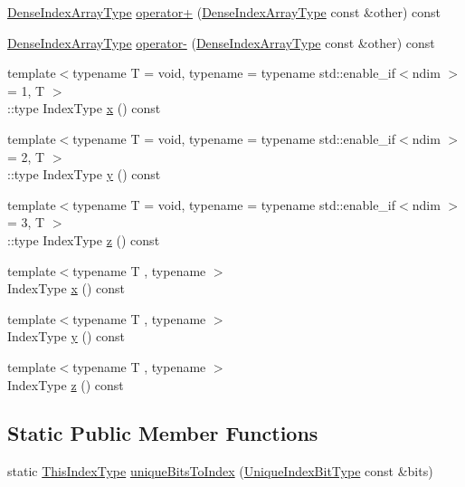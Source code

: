 \begin{DoxyCompactItemize}
\item 
\hyperlink{structvt_1_1index_1_1_dense_index_array_aec95c4ed1b4071d31d24142f02429dbd}{Dense\+Index\+Array\+Type} \hyperlink{structvt_1_1index_1_1_dense_index_array_a2f63f2603e58cf017c07f11f9e233409}{operator+} (\hyperlink{structvt_1_1index_1_1_dense_index_array_aec95c4ed1b4071d31d24142f02429dbd}{Dense\+Index\+Array\+Type} const \&other) const
\item 
\hyperlink{structvt_1_1index_1_1_dense_index_array_aec95c4ed1b4071d31d24142f02429dbd}{Dense\+Index\+Array\+Type} \hyperlink{structvt_1_1index_1_1_dense_index_array_a828670d9617980741517481c39b8212f}{operator-\/} (\hyperlink{structvt_1_1index_1_1_dense_index_array_aec95c4ed1b4071d31d24142f02429dbd}{Dense\+Index\+Array\+Type} const \&other) const
\item 
{\footnotesize template$<$typename T  = void, typename  = typename std\+::enable\+\_\+if$<$ndim $>$= 1, T $>$ }\\\+::type Index\+Type \hyperlink{structvt_1_1index_1_1_dense_index_array_a0604b24914af854d09d4da97eae4ef74}{x} () const
\item 
{\footnotesize template$<$typename T  = void, typename  = typename std\+::enable\+\_\+if$<$ndim $>$= 2, T $>$ }\\\+::type Index\+Type \hyperlink{structvt_1_1index_1_1_dense_index_array_a6f150c2dbed44d633b4dc3b62aea2c9b}{y} () const
\item 
{\footnotesize template$<$typename T  = void, typename  = typename std\+::enable\+\_\+if$<$ndim $>$= 3, T $>$ }\\\+::type Index\+Type \hyperlink{structvt_1_1index_1_1_dense_index_array_a8de61716f67863e9c1eca84f8c99de22}{z} () const
\item 
{\footnotesize template$<$typename T , typename $>$ }\\Index\+Type \hyperlink{structvt_1_1index_1_1_dense_index_array_af5731c29e392485535d090b57b66a6f5}{x} () const
\item 
{\footnotesize template$<$typename T , typename $>$ }\\Index\+Type \hyperlink{structvt_1_1index_1_1_dense_index_array_a23d6673153f284a46bad6e1be6781e08}{y} () const
\item 
{\footnotesize template$<$typename T , typename $>$ }\\Index\+Type \hyperlink{structvt_1_1index_1_1_dense_index_array_a9bd7a86415c7ce861f5cf17dd5a849e0}{z} () const
\end{DoxyCompactItemize}
\subsection*{Static Public Member Functions}
\begin{DoxyCompactItemize}
\item 
static \hyperlink{structvt_1_1index_1_1_dense_index_array_a6915511f6a82dff2522d6e8c2be20f2a}{This\+Index\+Type} \hyperlink{structvt_1_1index_1_1_dense_index_array_ad9f18d4b0c0b5082c533286288c42529}{unique\+Bits\+To\+Index} (\hyperlink{namespacevt_a913e1f07b5228dd8bb64040dc6dcea14}{Unique\+Index\+Bit\+Type} const \&bits)
\end{DoxyCompactItemize}
